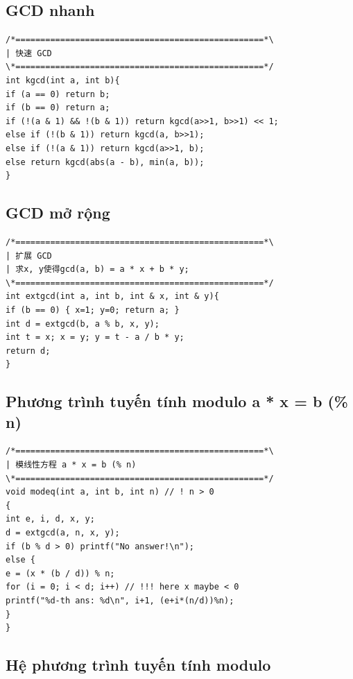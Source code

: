 \documentclass[11pt]{article}
\begin{document}
\subsection{GCD nhanh}

\begingroup
\scriptsize
\begin{verbatim}
/*==================================================*\
| 快速 GCD
\*==================================================*/
int kgcd(int a, int b){
if (a == 0) return b;
if (b == 0) return a;
if (!(a & 1) && !(b & 1)) return kgcd(a>>1, b>>1) << 1;
else if (!(b & 1)) return kgcd(a, b>>1);
else if (!(a & 1)) return kgcd(a>>1, b);
else return kgcd(abs(a - b), min(a, b));
}
\end{verbatim}
\endgroup

\subsection{GCD mở rộng}

\begingroup
\scriptsize
\begin{verbatim}
/*==================================================*\
| 扩展 GCD
| 求x, y使得gcd(a, b) = a * x + b * y;
\*==================================================*/
int extgcd(int a, int b, int & x, int & y){
if (b == 0) { x=1; y=0; return a; }
int d = extgcd(b, a % b, x, y);
int t = x; x = y; y = t - a / b * y;
return d;
}
\end{verbatim}
\endgroup

\subsection{Phương trình tuyến tính modulo a * x = b (\% n)}

\begingroup
\scriptsize
\begin{verbatim}
/*==================================================*\
| 模线性方程 a * x = b (% n)
\*==================================================*/
void modeq(int a, int b, int n) // ! n > 0
{
int e, i, d, x, y;
d = extgcd(a, n, x, y);
if (b % d > 0) printf("No answer!\n");
else {
e = (x * (b / d)) % n;
for (i = 0; i < d; i++) // !!! here x maybe < 0
printf("%d-th ans: %d\n", i+1, (e+i*(n/d))%n);
}
}
\end{verbatim}
\endgroup

\subsection{Hệ phương trình tuyến tính modulo}
\end{document}
